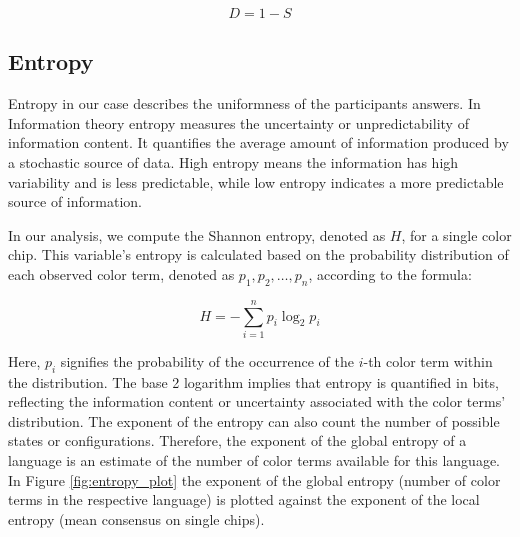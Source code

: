 \[
D = 1 - S
\]



\subsection{Entropy}
Entropy in our case describes the uniformness of the participants answers. In Information theory entropy measures the uncertainty or unpredictability of information content. It quantifies the average amount of information produced by a stochastic source of data. High entropy means the information has high variability and is less predictable, while low entropy indicates a more predictable source of information.

In our analysis, we compute the Shannon entropy, denoted as $H$, for a single color chip. This variable's entropy is calculated based on the probability distribution of each observed color term, denoted as $p_1, p_2, \ldots, p_n$, according to the formula:

\begin{equation}
H = -\sum_{i=1}^{n} p_i \log_2 p_i
\end{equation}

Here, $p_i$ signifies the probability of the occurrence of the $i$-th color term within the distribution. The base 2 logarithm implies that entropy is quantified in bits, reflecting the information content or uncertainty associated with the color terms' distribution.
The exponent of the entropy can also count the number of possible states or configurations. Therefore, the exponent of the global entropy of a language is an estimate of the number of color terms available for this language. In Figure \ref{fig:entropy_plot} the exponent of the global entropy (number of color terms in the respective language) is plotted against the exponent of the local entropy (mean consensus on single chips).

